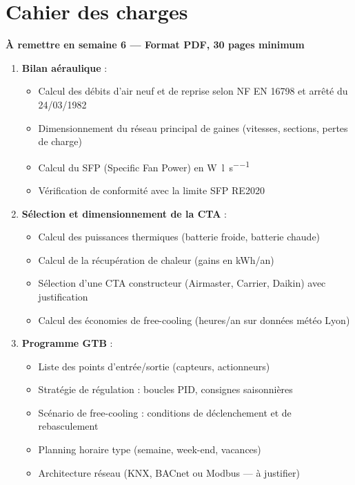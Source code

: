 \section{Cahier des charges}

\begin{methode}
\textbf{À remettre en semaine 6 — Format PDF, 30 pages minimum}

\begin{enumerate}
  \item \textbf{Bilan aéraulique} :
    \begin{itemize}
      \item Calcul des débits d'air neuf et de reprise selon NF EN 16798 et arrêté du 24/03/1982
      \item Dimensionnement du réseau principal de gaines (vitesses, sections, pertes de charge)
      \item Calcul du SFP (Specific Fan Power) en \si{\watt\per\litre\per\second}
      \item Vérification de conformité avec la limite SFP RE2020
    \end{itemize}

  \item \textbf{Sélection et dimensionnement de la CTA} :
    \begin{itemize}
      \item Calcul des puissances thermiques (batterie froide, batterie chaude)
      \item Calcul de la récupération de chaleur (gains en kWh/an)
      \item Sélection d'une CTA constructeur (Airmaster, Carrier, Daikin) avec justification
      \item Calcul des économies de free-cooling (heures/an sur données météo Lyon)
    \end{itemize}

  \item \textbf{Programme GTB} :
    \begin{itemize}
      \item Liste des points d'entrée/sortie (capteurs, actionneurs)
      \item Stratégie de régulation : boucles PID, consignes saisonnières
      \item Scénario de free-cooling : conditions de déclenchement et de rebasculement
      \item Planning horaire type (semaine, week-end, vacances)
      \item Architecture réseau (KNX, BACnet ou Modbus — à justifier)
    \end{itemize}


\end{enumerate}
\end{methode}
